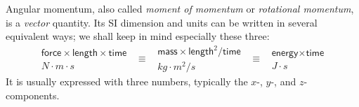 \documentclass[a4paper,12pt,%
onecolumn,oneside,titlepage,%
british%
]{memoir}
\renewcommand*{\|}[1][]{\nonscript\:#1\vert\nonscript\:\mathopen{}}
\begin{document}
Angular momentum, also called \emph{moment of momentum} or \emph{rotational momentum}, is a \emph{vector} quantity. Its SI dimension and units can be written in several equivalent ways; we shall keep in mind especially these three:
\begin{equation*}
  \begin{gathered}
    \textsf{force}\times\textsf{length}\times\textsf{time}
    \\\unit{N\cdot m\cdot s}
  \end{gathered}
\enspace  \equiv\enspace
  \begin{gathered}
  \textsf{mass}\times\textsf{length}^{2}/\textsf{time}
    \\\unit{kg\cdot m^{2}/s}
  \end{gathered}
\enspace  \equiv\enspace
  \begin{gathered}
  \textsf{energy}\times\textsf{time}
    \\\unit{J\cdot s}
  \end{gathered}
\end{equation*}
It is usually expressed with three numbers, typically the $x$-, $y$-, and $z$-components.
\end{document}
